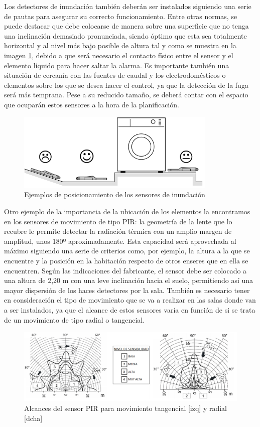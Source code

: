 Los detectores de inundación también deberán ser instalados siguiendo una serie de pautas para asegurar su correcto funcionamiento. Entre otras normas, se puede destacar que debe colocarse de manera sobre una superficie que no tenga una inclinación demasiado pronunciada, siendo óptimo que esta sea totalmente horizontal y al nivel más bajo posible de altura tal y como se muestra en la imagen \ref{fig:local_inundacion}, debido a que será necesario el contacto físico entre el sensor y el elemento líquido para hacer saltar la alarma. Es importante también una situación de cercanía con las fuentes de caudal y los electrodomésticos o elementos sobre los que se desea hacer el control, ya que la detección de la fuga será más temprana. Pese a su reducido tamaño, se deberá contar con el espacio que ocuparán estos sensores a la hora de la planificación.
\begin{figure}[H]
\begin{center}
\includegraphics[width=0.85\textwidth]{figures/local_inundacion.png}   
\caption{Ejemplos de posicionamiento de los sensores de inundación}
\label{fig:local_inundacion}
\end{center}
\end{figure}
Otro ejemplo de la importancia de la ubicación de los elementos la encontramos en los sensores de movimiento de tipo PIR: la geometría de la lente que lo recubre le permite detectar la radiación térmica con un amplio margen de amplitud, unos 180º aproximadamente. Esta capacidad será aprovechada al máximo siguiendo una serie de criterios como, por ejemplo, la altura a la que se encuentre y la posición en la habitación respecto de otros enseres que en ella se encuentren. Según las indicaciones del fabricante, el sensor debe ser colocado a una altura de 2,20 m con una leve inclinación hacia el suelo, permitiendo así una mayor dispersión de los haces detectores por la sala. También es necesario tener en consideración el tipo de movimiento que se va a realizar en las salas donde van a ser instalados, ya que el alcance de estos sensores varía en función de si se trata de un movimiento de tipo radial o tangencial.
\begin{figure}[H]
\includegraphics[width=1.15\textwidth]{figures/alcance_PIR.png}   
\caption{Alcances del sensor PIR para movimiento tangencial [izq] y radial [dcha]}
\label{fig:alcance_PIR}
\end{figure}

